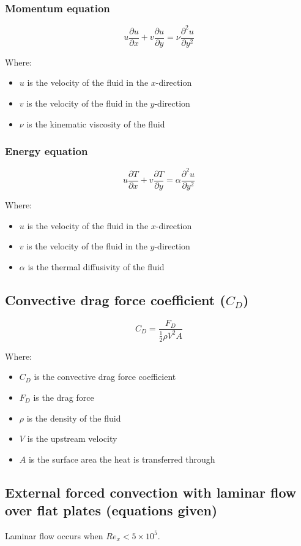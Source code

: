 \documentclass[11pt]{article}
\begin{document}
\subsubsection{Momentum equation}
\label{sec:org6d5c259}
\[u \frac{\partial u}{\partial x} + v \frac{\partial u}{\partial y} = \nu \frac{\partial^2 u}{\partial y^2}\]

Where:
\begin{itemize}
\item \(u\) is the velocity of the fluid in the \(x\)-direction
\item \(v\) is the velocity of the fluid in the \(y\)-direction
\item \(\nu\) is the kinematic viscosity of the fluid
\end{itemize}

\subsubsection{Energy equation}
\label{sec:org8ea4c3e}
\[u \frac{\partial T}{\partial x} + v \frac{\partial T}{\partial y} = \alpha \frac{\partial^2 u}{\partial y^2}\]

Where:
\begin{itemize}
\item \(u\) is the velocity of the fluid in the \(x\)-direction
\item \(v\) is the velocity of the fluid in the \(y\)-direction
\item \(\alpha\) is the thermal diffusivity of the fluid
\end{itemize}

\subsection{Convective drag force coefficient (\(C_D\))}
\label{sec:orgad57278}
\[C_D = \frac{F_D}{\frac{1}{2} \rho V^2 A}\]

Where:
\begin{itemize}
\item \(C_D\) is the convective drag force coefficient
\item \(F_D\) is the drag force
\item \(\rho\) is the density of the fluid
\item \(V\) is the upstream velocity
\item \(A\) is the surface area the heat is transferred through
\end{itemize}

\subsection{External forced convection with laminar flow over flat plates (equations given)}
\label{sec:org9885b26}
Laminar flow occurs when \(Re_x < 5 \times 10^5\).
\end{document}
